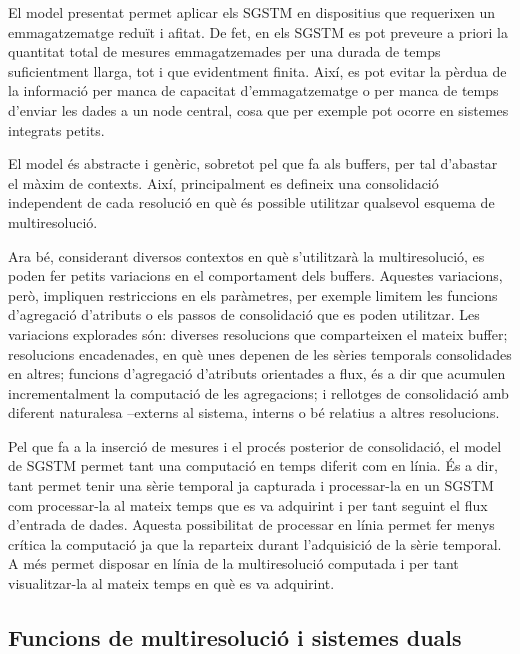 El model presentat permet aplicar els \gls{SGSTM} en dispositius que
requerixen un emmagatzematge reduït i afitat. De fet, en els
\gls{SGSTM} es pot preveure a priori la quantitat total de mesures
emmagatzemades per una durada de temps suficientment llarga, tot i que
evidentment finita. Així, es pot evitar la pèrdua de la informació per
manca de capacitat d'emmagatzematge o per manca de temps d'enviar les
dades a un node central, cosa que per exemple pot ocorre en sistemes
integrats petits.


El model és abstracte i genèric, sobretot pel que fa als buffers, per
tal d'abastar el màxim de contexts. Així, principalment es defineix
una consolidació independent de cada resolució en què és possible
utilitzar qualsevol esquema de multiresolució.



Ara bé, considerant diversos contextos en què s'utilitzarà la
multiresolució, es poden fer petits variacions en el comportament dels
buffers. Aquestes variacions, però, impliquen restriccions en els
paràmetres, per exemple limitem les funcions d'agregació d'atributs o
els passos de consolidació que es poden utilitzar.  Les variacions
explorades són: diverses resolucions que comparteixen el mateix
buffer; resolucions encadenades, en què unes depenen de les sèries
temporals consolidades en altres; funcions d'agregació d'atributs
orientades a flux, és a dir que acumulen incrementalment la computació
de les agregacions; i rellotges de consolidació amb diferent
naturalesa --externs al sistema, interns o bé relatius a altres
resolucions.




Pel que fa a la inserció de mesures i el procés posterior de
consolidació, el model de \gls{SGSTM} permet tant una computació en
temps diferit com en línia. És a dir, tant permet tenir una sèrie
temporal ja capturada i processar-la en un \gls{SGSTM} com
processar-la al mateix temps que es va adquirint i per tant seguint el
flux d'entrada de dades.  Aquesta possibilitat de processar en línia
permet fer menys crítica la computació ja que la reparteix durant
l'adquisició de la sèrie temporal. A més permet disposar en línia de
la multiresolució computada i per tant visualitzar-la al mateix temps
en què es va adquirint.






\subsection{Funcions de multiresolució i sistemes duals}


